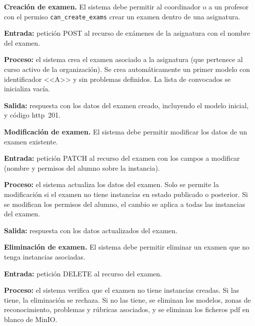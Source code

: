 \begin{functional}

    \item \textbf{Creación de examen.} \label{rf:exams:create}
    El sistema debe permitir al coordinador o a un profesor con el permiso
    \texttt{can\_create\_exams} crear un examen dentro de una asignatura.

    \textbf{Entrada:} petición POST al recurso de exámenes de la asignatura con el nombre
    del examen.

    \textbf{Proceso:} el sistema crea el examen asociado a la asignatura (que pertenece al
    curso activo de la organización). Se crea automáticamente un primer modelo con
    identificador <<A>> y sin problemas definidos. La lista de convocados se inicializa
    vacía.

    \textbf{Salida:} respuesta con los datos del examen creado, incluyendo el modelo inicial,
    y código \acs{http}~201.

    \item \textbf{Modificación de examen.} \label{rf:exams:update}
    El sistema debe permitir modificar los datos de un examen existente.

    \textbf{Entrada:} petición PATCH al recurso del examen con los campos a modificar
    (nombre y permisos del alumno sobre la instancia).

    \textbf{Proceso:} el sistema actualiza los datos del examen. Solo se permite la
    modificación si el examen no tiene instancias en estado publicado o posterior. Si se
    modifican los permisos del alumno, el cambio se aplica a todas las instancias del
    examen.

    \textbf{Salida:} respuesta con los datos actualizados del examen.

    \item \textbf{Eliminación de examen.} \label{rf:exams:delete}
    El sistema debe permitir eliminar un examen que no tenga instancias asociadas.

    \textbf{Entrada:} petición DELETE al recurso del examen.

    \textbf{Proceso:} el sistema verifica que el examen no tiene instancias creadas. Si las
    tiene, la eliminación se rechaza. Si no las tiene, se eliminan los modelos, zonas de
    reconocimiento, problemas y rúbricas asociados, y se eliminan los ficheros \acs{pdf} en
    blanco de MinIO.


\end{functional}
